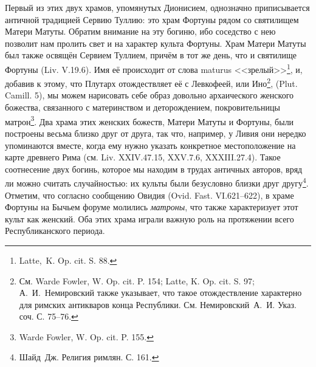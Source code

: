 Первый из этих двух храмов, упомянутых Дионисием, однозначно приписывается античной традицией Сервию Туллию: это храм Фортуны рядом со святилищем Матери Матуты. Обратим внимание на эту богиню, ибо соседство с нею позволит нам пролить свет и на характер культа Фортуны. Храм Матери Матуты был также освящён Сервием Туллием, причём в тот же день, что и святилище Фортуны (Liv. V.19.6). Имя её происходит от слова maturus <<зрелый>>\footnote{Latte,~K. Op. cit. S. 88.}, и, добавив к этому, что Плутарх отождествляет её с Левкофеей, или Ино\footnote{См. Warde Fowler, W. Op. cit. P. 154; Latte, K. Op. cit. S. 97; А.~И.~Немировский также указывает, что такое отождествление характерно для римских антикваров конца Республики. См. Немировский~А.~И. Указ. соч. С. 75--76.}, (Plut. Camill. 5), мы можем нарисовать себе образ довольно архаического женского божества, связанного с материнством и деторождением, покровительницы матрон\footnote{Warde Fowler, W. Op. cit. P. 155.}. Два храма этих женских божеств, Матери Матуты и Фортуны, были построены весьма близко друг от друга, так что, например, у Ливия они нередко упоминаются вместе, когда ему нужно указать конкретное местоположение на карте древнего Рима (см. Liv. XXIV.47.15, XXV.7.6, XXXIII.27.4). Такое соотнесение двух богинь, которое мы находим в трудах античных авторов, вряд ли можно считать случайностью: их культы были безусловно близки друг другу\footnote{Шайд~Дж. Религия римлян. С. 161.}. Отметим, что согласно сообщению Овидия (Ovid. Fast. VI.621--622), в храме Фортуны на Бычьем форуме молились \textit{матроны}, что также характеризует этот культ как женский. Оба этих храма играли важную роль на протяжении всего Республиканского периода.

